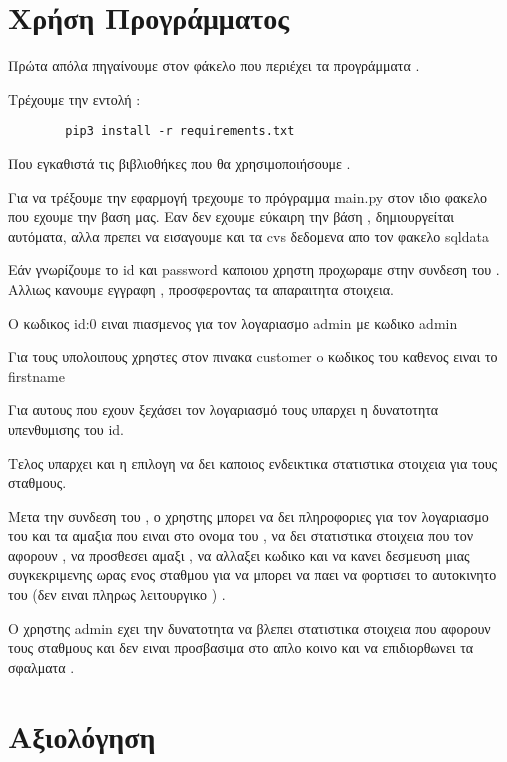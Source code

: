 \documentclass[manuscript,screen,review]{acmart}
\newcommand{\en}[1]{\foreignlanguage{english}{#1}}
\begin{document}
\section{Χρήση Προγράμματος}

 Πρώτα απόλα πηγαίνουμε στον φάκελο που περιέχει τα προγράμματα . 

  Τρέχουμε την εντολή :
    \begin{lstlisting}
        pip3 install -r requirements.txt
    \end{lstlisting}
Που εγκαθιστά τις βιβλιοθήκες που θα χρησιμοποιήσουμε . \newline\newline

 Για να τρέξουμε την εφαρμογή τρεχουμε το πρόγραμμα \en{main.py} στον ιδιο φακελο που εχουμε την βαση μας. Εαν δεν εχουμε εύκαιρη την βάση , δημιουργείται αυτόματα, αλλα πρεπει να εισαγουμε και τα \en{cvs} δεδομενα απο τον φακελο  \en{sqldata}

 Εάν γνωρίζουμε το \en{id} και \en{password} καποιου χρηστη προχωραμε στην συνδεση του . Αλλιως κανουμε εγγραφη , προσφεροντας τα απαραιτητα στοιχεια. 
 
 Ο κωδικος \en{id}:0 ειναι πιασμενος για τον λογαριασμο \en{admin}  με κωδικο \en{admin}\newline

 Για τους υπολοιπους χρηστες στον πινακα \en{customer} o κωδικος του καθενος ειναι το \en{firstname}

 Για αυτους που εχουν ξεχάσει τον λογαριασμό τους υπαρχει η δυνατοτητα υπενθυμισης του \en{id}.

 Τελος υπαρχει και η επιλογη να δει καποιος ενδεικτικα στατιστικα στοιχεια για τους σταθμους. 

 Μετα την συνδεση του , ο χρηστης μπορει να δει πληροφοριες για τον λογαριασμο του και τα αμαξια που ειναι στο ονομα του , να δει στατιστικα στοιχεια που τον αφορουν , να προσθεσει αμαξι , να αλλαξει κωδικο και να κανει δεσμευση μιας συγκεκριμενης ωρας ενος σταθμου για να μπορει να παει να φορτισει το αυτοκινητο του (δεν ειναι πληρως λειτουργικο ) .\newline\newline 

 Ο χρηστης \en{admin} εχει την δυνατοτητα να βλεπει στατιστικα στοιχεια που αφορουν τους σταθμους και δεν ειναι προσβασιμα στο απλο κοινο και να επιδιορθωνει τα σφαλματα . 
 
\newpage
\section{Αξιολόγηση}
\end{document}
